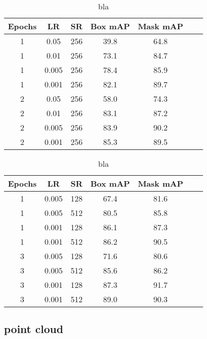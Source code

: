\begin{table}
	\centering
	\caption[Detection evaluation]{bla}
	\label{tab:detection_eval1}
	\begin{tabular}[H!]{ccccccc}
		\toprule
		\textbf{Epochs} & \textbf{LR} & \textbf{SR} & \textbf{Box mAP} & \textbf{Mask mAP} \\
		\midrule
		1               & 0.05        & 256         & 39.8             & 64.8              \\
		1               & 0.01        & 256         & 73.1             & 84.7              \\
		1               & 0.005       & 256         & 78.4             & 85.9              \\
		1               & 0.001       & 256         & 82.1             & 89.7              \\
		2               & 0.05        & 256         & 58.0             & 74.3              \\
		2               & 0.01        & 256         & 83.1             & 87.2              \\
		2               & 0.005       & 256         & 83.9             & 90.2              \\
		2               & 0.001       & 256         & 85.3             & 89.5              \\
		\bottomrule
	\end{tabular}
\end{table}

\begin{table}
	\centering
	\caption[Detection evaluation]{bla}
	\label{tab:detection_eval}
	\begin{tabular}[H!]{ccccccc}
		\toprule
		\textbf{Epochs} & \textbf{LR} & \textbf{SR} & \textbf{Box mAP} & \textbf{Mask mAP} \\
		\midrule
		1               & 0.005       & 128         & 67.4             & 81.6              \\
		1               & 0.005       & 512         & 80.5             & 85.8              \\
		1               & 0.001       & 128         & 86.1             & 87.3              \\
		1               & 0.001       & 512         & 86.2             & 90.5              \\
		3               & 0.005       & 128         & 71.6             & 80.6              \\
		3               & 0.005       & 512         & 85.6             & 86.2              \\
		3               & 0.001       & 128         & 87.3             & 91.7              \\
		3               & 0.001       & 512         & 89.0             & 90.3              \\
		\bottomrule
	\end{tabular}
\end{table}

\subsection{point cloud}
